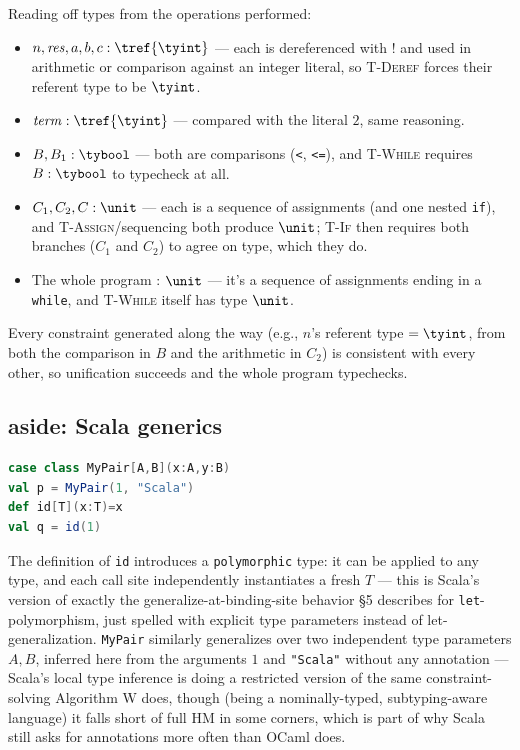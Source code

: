 Reading off types from the operations performed:
\begin{itemize}
  \item $n, \mathit{res}, a, b, c : \tref{\tyint}$ — each is dereferenced with $!$ and used in arithmetic or comparison against an integer literal, so \textsc{T-Deref} forces their referent type to be $\tyint$.
  \item $\mathit{term} : \tref{\tyint}$ — compared with the literal $2$, same reasoning.
  \item $B, B_1 : \tybool$ — both are comparisons (\lstinline|<|, \lstinline|<=|), and \textsc{T-While} requires $B:\tybool$ to typecheck at all.
  \item $C_1, C_2, C : \unit$ — each is a sequence of assignments (and one nested \lstinline|if|), and \textsc{T-Assign}/sequencing both produce $\unit$; \textsc{T-If} then requires both branches ($C_1$ and $C_2$) to agree on type, which they do.
  \item The whole program : $\unit$ — it's a sequence of assignments ending in a \lstinline|while|, and \textsc{T-While} itself has type $\unit$.
\end{itemize}
Every constraint generated along the way (e.g., $n$'s referent type $=\tyint$, from both the comparison in $B$ and the arithmetic in $C_2$) is consistent with every other, so unification succeeds and the whole program typechecks.

\subsection{aside: Scala generics}
\begin{lstlisting}[language=Scala]
case class MyPair[A,B](x:A,y:B)
val p = MyPair(1, "Scala")
def id[T](x:T)=x
val q = id(1)
\end{lstlisting}
The definition of \lstinline|id| introduces a \texttt{polymorphic} type: it can be applied to any type, and each call site independently instantiates a fresh $T$ — this is Scala's version of exactly the generalize-at-binding-site behavior \S5 describes for \lstinline|let|-polymorphism, just spelled with explicit type parameters instead of let-generalization. \lstinline|MyPair| similarly generalizes over two independent type parameters $A,B$, inferred here from the arguments $1$ and \lstinline|"Scala"| without any annotation — Scala's local type inference is doing a restricted version of the same constraint-solving Algorithm W does, though (being a nominally-typed, subtyping-aware language) it falls short of full HM in some corners, which is part of why Scala still asks for annotations more often than OCaml does.

